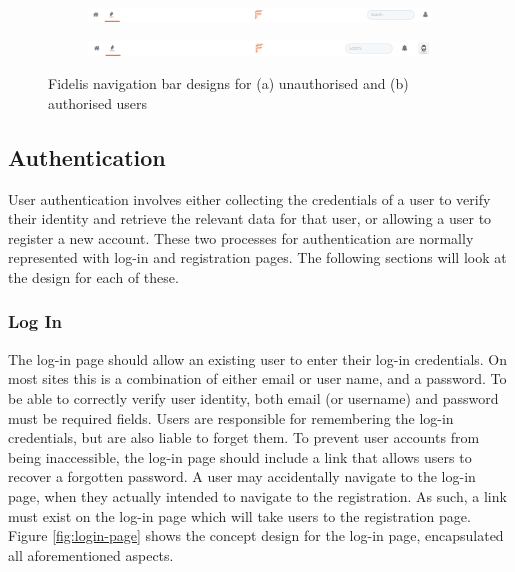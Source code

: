 \begin{figure}[H]
\centering
\begin{subfigure}{1\linewidth}
	\includegraphics[width=1\linewidth]{Images/Design/nav-unauthorised}
	\caption{}
	\label{fig:nav-unauth}
\end{subfigure}
\begin{subfigure}{1\linewidth}
	\includegraphics[width=1\linewidth]{Images/Design/nav-authorised}
	\caption{}
	\label{fig:nav-auth}
\end{subfigure}
\caption{Fidelis navigation bar designs for (a) unauthorised and (b) authorised users}
\label{fig:fidelis-navs}
\end{figure}

\subsection{Authentication}
User authentication involves either collecting the credentials of a user to verify their identity and retrieve the relevant data for that user, or allowing a user to register a new account. These two processes for authentication are normally represented with log-in and registration pages. The following sections will look at the design for each of these.

\subsubsection{Log In}
The log-in page should allow an existing user to enter their log-in credentials. On most sites this is a combination of either email or user name, and a password. To be able to correctly verify user identity, both email (or username) and password must be required fields. Users are responsible for remembering the log-in credentials, but are also liable to forget them. To prevent user accounts from being inaccessible, the log-in page should include a link that allows users to recover a forgotten password. A user may accidentally navigate to the log-in page, when they actually intended to navigate to the registration. As such, a link must exist on the log-in page which will take users to the registration page. Figure \ref{fig:login-page} shows the concept design for the log-in page, encapsulated all aforementioned aspects.

